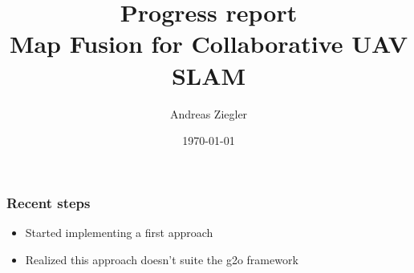 \documentclass[xcolor={x11names}]{beamer}
\title[Map Fusion for Collaborative UAV SLAM]{Progress report\\Map Fusion for Collaborative UAV SLAM} %
\author{Andreas Ziegler} %
\institute[V4RL@ETHZ] %
{
  \texttt{[image: ../V4RLLogo]} \\ETH Zurich \\ %
\medskip
\textit{anziegle@ethz.ch} %
}
\date{\today} %
\begin{document}
\begin{frame}
\titlepage %
\end{frame}





\begin{frame}
\frametitle{Recent steps}
\begin{itemize}
  \item Started implementing a first approach
  \item Realized this approach doesn't suite the g2o framework
\end{itemize}
\end{frame}

\end{document}
